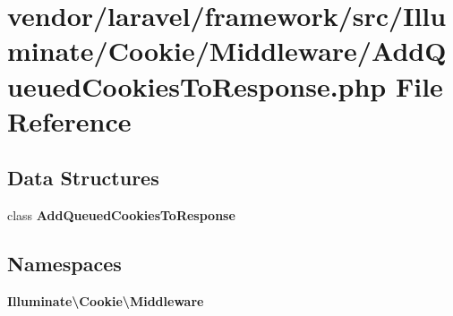 \section{vendor/laravel/framework/src/\+Illuminate/\+Cookie/\+Middleware/\+Add\+Queued\+Cookies\+To\+Response.php File Reference}
\label{_add_queued_cookies_to_response_8php}
\subsection*{Data Structures}
\begin{DoxyCompactItemize}
\item 
class {\bf Add\+Queued\+Cookies\+To\+Response}
\end{DoxyCompactItemize}
\subsection*{Namespaces}
\begin{DoxyCompactItemize}
\item 
 {\bf Illuminate\textbackslash{}\+Cookie\textbackslash{}\+Middleware}
\end{DoxyCompactItemize}
